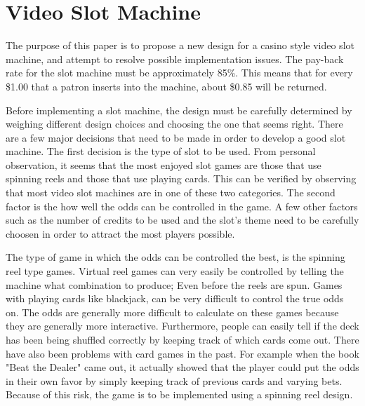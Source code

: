 
\section{Video Slot Machine}

The purpose of this paper is to propose a new design for a casino style video slot machine, and attempt to resolve possible implementation issues.  The pay-back rate for the slot machine must be approximately 85\%.  This means that for every \$1.00 that a patron inserts into the machine, about \$0.85 will be returned.



  Before implementing a slot machine, the design must be carefully determined by weighing different design choices and choosing the one that seems right.  There are a few major decisions that need to be made in order to develop a good slot machine.  The first decision is the type of slot to be used. From personal observation, it seems that the most enjoyed slot games are those that use spinning reels and those that use playing cards. This can be verified by observing that most video slot machines are in one of these two categories. The second factor is the how well the odds can be controlled in the game.  A few other factors such as the number of credits to be used and the slot's theme need to be carefully choosen in order to attract the most players possible.
  
  The type of game in which the odds can be controlled the best, is the spinning reel type games.  Virtual reel games can very easily be controlled by telling the machine what combination to produce; Even before the reels are spun.  Games with playing cards like blackjack, can be very difficult to control the true odds on.  The odds are generally more difficult to calculate on these games because they are generally more interactive.  Furthermore, people can easily tell if the deck has been being shuffled correctly by keeping track of which cards come out.  There have also been problems with card games in the past.  For example when the book "Beat the Dealer" came out, it actually showed that the player could put the odds in their own favor by simply keeping track of previous cards and varying bets.  Because of this risk, the game is to be implemented using a spinning reel design.

